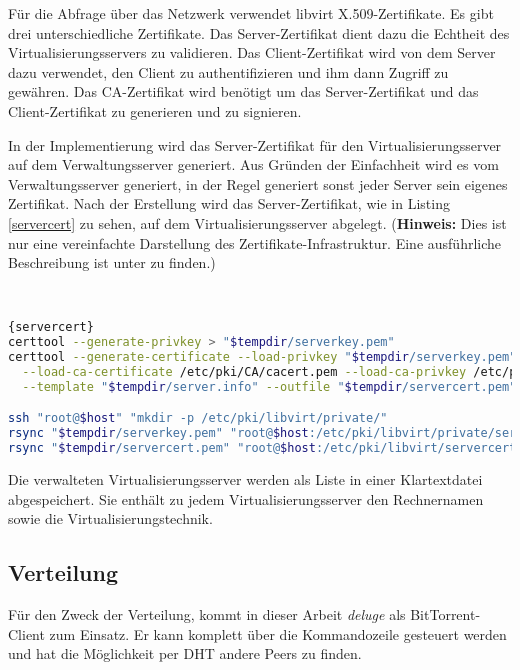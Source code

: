 { \fontsize{12.3pt}{16.8pt}\selectfont
Für die Abfrage über das Netzwerk verwendet libvirt X.509-Zertifikate. Es gibt drei unterschiedliche Zertifikate. Das Server-Zertifikat dient dazu die Echtheit des Virtualisierungsservers zu validieren. Das Client-Zertifikat wird von dem Server dazu verwendet, den Client zu authentifizieren und ihm dann Zugriff zu gewähren. Das CA-Zertifikat wird benötigt um das Server-Zertifikat und das Client-Zertifikat zu generieren und zu signieren.

In der Implementierung wird das Server-Zertifikat für den Virtualisierungsserver auf dem Verwaltungsserver generiert. Aus Gründen der Einfachheit wird es vom Verwaltungsserver generiert, in der Regel generiert sonst jeder Server sein eigenes Zertifikat. Nach der Erstellung wird das Server-Zertifikat, wie in Listing \ref{servercert} zu sehen, auf dem Virtualisierungsserver abgelegt. (\textbf{Hinweis:} Dies ist nur eine vereinfachte Darstellung des Zertifikate-Infrastruktur. Eine ausführliche Beschreibung ist unter \cite{Libvirttls} zu finden.) }
\\
\begin{lstlisting}[caption=Erstellung des Server-Zertifikats für den jeweiligen Virtualisierungsserver (servercert.sh),language=Bash,label=servercert]{servercert}
certtool --generate-privkey > "$tempdir/serverkey.pem"
certtool --generate-certificate --load-privkey "$tempdir/serverkey.pem" \
  --load-ca-certificate /etc/pki/CA/cacert.pem --load-ca-privkey /etc/pki/CA/private/cakey.pem \
  --template "$tempdir/server.info" --outfile "$tempdir/servercert.pem" 2> "/var/log/cow.log"

ssh "root@$host" "mkdir -p /etc/pki/libvirt/private/"
rsync "$tempdir/serverkey.pem" "root@$host:/etc/pki/libvirt/private/serverkey.pem"
rsync "$tempdir/servercert.pem" "root@$host:/etc/pki/libvirt/servercert.pem"
\end{lstlisting}

Die verwalteten Virtualisierungsserver werden als Liste in einer Klartextdatei abgespeichert. Sie enthält zu jedem Virtualisierungsserver den Rechnernamen sowie die Virtualisierungstechnik. \label{vhosts}

\subsection{Verteilung}\label{verteilung}
Für den Zweck der Verteilung, kommt in dieser Arbeit \textit{deluge} als BitTorrent-Client zum Einsatz. Er kann komplett über die Kommandozeile gesteuert werden und hat die Möglichkeit per DHT andere Peers zu finden.

